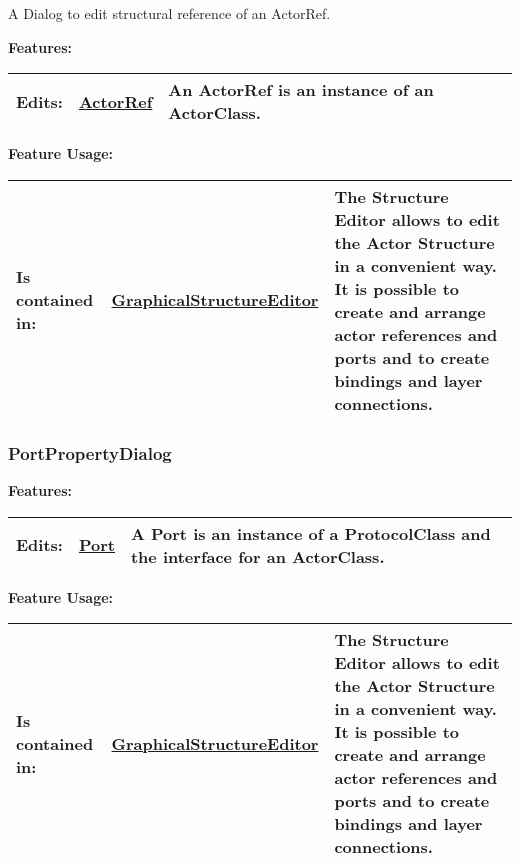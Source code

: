 		A Dialog to edit structural reference of an ActorRef.
		
		
		
		\begingroup
		\textbf{Features:}
		\renewcommand{\arraystretch}{1.8} %
		\begin{longtable}{l|l p{}}
			\hline
		Edits: & \tabitem \hyperlink{ref:ActorRef}{ActorRef}  & An ActorRef is an instance of an ActorClass.\\
		\hline
		\end{longtable}
		\endgroup
		
		\begingroup
		\textbf{Feature Usage:}
		\renewcommand{\arraystretch}{1.8} %
		\begin{longtable}{l|l p{}}
			\hline
		Is contained in: & \tabitem \hyperlink{ref:GraphicalStructureEditor}{GraphicalStructureEditor}  & The Structure Editor allows to edit the Actor Structure in a convenient way. It is possible to create and arrange actor references and ports and to create bindings and layer connections.\\
		\hline
		\end{longtable}
		\endgroup
		
		
	\vspace{\baselineskip}
	\vspace{\baselineskip}
	\vspace{\baselineskip}
	
	\subsubsection{PortPropertyDialog}
		\hypertarget{ref:PortPropertyDialog}{}
		
		
		
		
		\begingroup
		\textbf{Features:}
		\renewcommand{\arraystretch}{1.8} %
		\begin{longtable}{l|l p{}}
			\hline
		Edits: & \tabitem \hyperlink{ref:Port}{Port}  & A Port is an instance of a ProtocolClass and the interface for an ActorClass.\\
		\hline
		\end{longtable}
		\endgroup
		
		\begingroup
		\textbf{Feature Usage:}
		\renewcommand{\arraystretch}{1.8} %
		\begin{longtable}{l|l p{}}
			\hline
		Is contained in: & \tabitem \hyperlink{ref:GraphicalStructureEditor}{GraphicalStructureEditor}  & The Structure Editor allows to edit the Actor Structure in a convenient way. It is possible to create and arrange actor references and ports and to create bindings and layer connections.\\
		\hline
		\end{longtable}
		\endgroup
		
